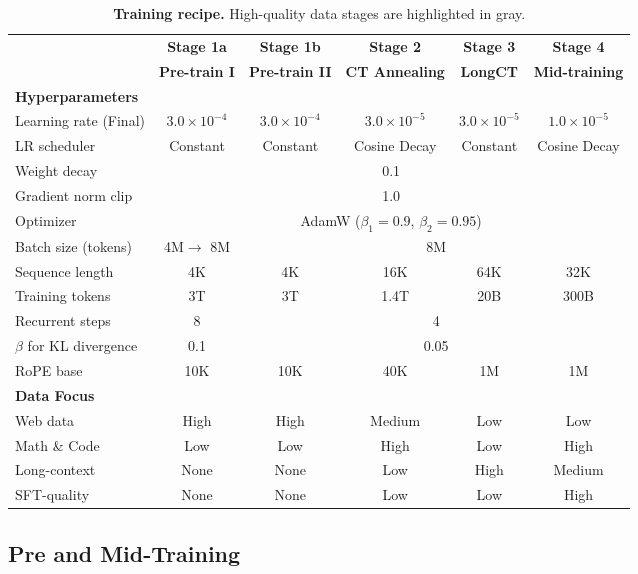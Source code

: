 \documentclass[]{bytedance_seed}
\newcommand{\1}{\mathbf{1}}
\begin{document}
\begin{table}[b!]
\small
\centering
\caption{\textbf{Training recipe.} High-quality data stages are highlighted in \colorbox{lightergray}{gray}.}
\label{tab:training_recipe}
\begin{tabular}{l|ccccc}
\toprule
 & \textbf{Stage 1a} & \textbf{Stage 1b} & \textbf{Stage 2} & \textbf{Stage 3} & \textbf{Stage 4} \\
 & \textbf{Pre-train I} & \textbf{Pre-train II} & \textbf{CT Annealing} & \textbf{LongCT} & \textbf{Mid-training} \\
\hline
\textbf{Hyperparameters} \\
Learning rate (Final) & $3.0\times10^{-4}$ & $3.0\times10^{-4}$ & $3.0\times10^{-5}$ & $3.0\times10^{-5}$ & $1.0\times10^{-5}$ \\
LR scheduler & Constant & Constant & Cosine Decay & Constant & Cosine Decay \\
Weight decay & \multicolumn{5}{c}{0.1} \\
Gradient norm clip & \multicolumn{5}{c}{1.0} \\
Optimizer & \multicolumn{5}{c}{AdamW ($\beta_1=0.9$, $\beta_2=0.95$)} \\
Batch size (tokens) &4M$\rightarrow$ 8M & \multicolumn{4}{c}{8M} \\
Sequence length & 4K & 4K & 16K & 64K & 32K \\
Training tokens & 3T & 3T & 1.4T & 20B & 300B \\
Recurrent steps & 8 & \multicolumn{4}{c}{4} \\
$\beta$ for KL divergence & 0.1 & \multicolumn{4}{c}{0.05} \\
RoPE base & 10K & 10K & 40K & 1M & 1M \\
\midrule
\textbf{Data Focus} \\
Web data & High & High & Medium & Low & Low \\
Math \& Code & Low & Low & High & Low & High \\
Long-context & None & None & Low & High & Medium \\
SFT-quality & None & None & Low & Low & High \\
\bottomrule
\end{tabular}
\end{table}


\subsection{Pre and Mid-Training}
\end{document}
